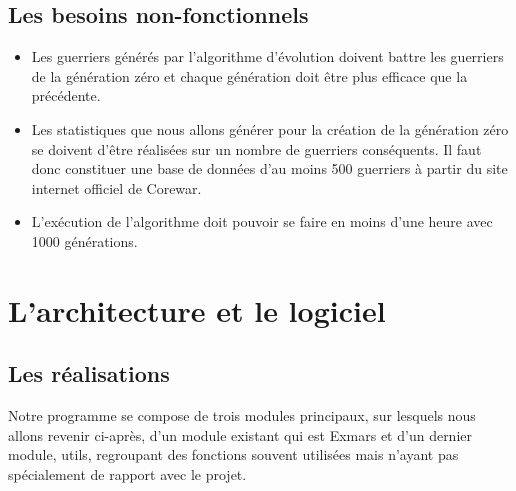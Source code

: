 \documentclass[french]{article}
\begin{document}
    \subsection{Les besoins non-fonctionnels}
    \begin{itemize}
        \item Les guerriers générés par l'algorithme d'évolution doivent battre les guerriers de la génération zéro et chaque génération doit être plus efficace que la précédente.\\
        
        \item Les statistiques que nous allons générer pour la création de la génération zéro se doivent d’être réalisées sur un nombre de guerriers conséquents. Il faut donc constituer une base de données d’au moins 500 guerriers à partir du site internet officiel de Corewar.\\
        
        \item L'exécution de l'algorithme doit pouvoir se faire en moins d'une heure avec 1000 générations.
        
    \end{itemize}

\newpage
\section{L'architecture et le logiciel}
    \subsection{Les réalisations}
        Notre programme se compose de trois modules principaux, sur lesquels nous allons revenir ci-après, d'un module existant qui est Exmars et d'un dernier module, utils, regroupant des fonctions souvent utilisées mais n'ayant pas spécialement de rapport avec le projet.
        
\end{document}

